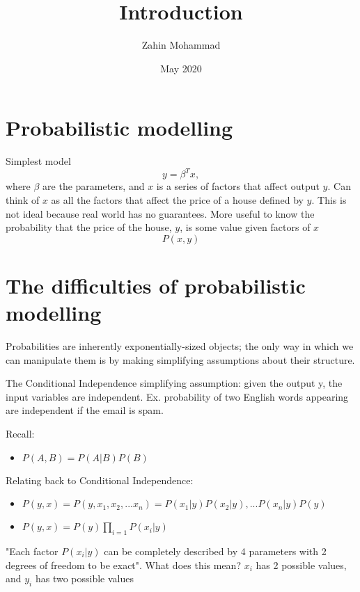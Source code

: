 \documentclass{article}
\title{Introduction}
\author{Zahin Mohammad}
\date{May 2020}
\begin{document}
\maketitle

\section{Probabilistic modelling}

    Simplest model 
    \begin{equation}
        y = \beta^Tx,
    \end{equation}
    where $\beta$ are the parameters, and $x$ is a series of factors that affect output $y$. Can think of $x$ as all the factors that affect the price of a house defined by $y$. This is not ideal because real world has no guarantees.
    \setlength{\parskip}{6pt}
    More useful to know the probability that the price of the house, $y$, is some value given factors of $x$
    \begin{equation}
        P(x,y)
    \end{equation}
\section{The difficulties of probabilistic modelling}
    Probabilities are inherently exponentially-sized objects; the only way in which we can manipulate them is by making simplifying assumptions about their structure.
    \setlength{\parskip}{6pt}

    The Conditional Independence simplifying assumption: given the output y, the input variables are independent. Ex. probability of two English words appearing are independent if the email is spam.
    
    Recall:
    \begin{itemize}
        \item $P(A,B) = P(A|B)P(B)$
    \end{itemize}

    Relating back to Conditional Independence:
    \begin{itemize}
        \item $P(y,x) = P(y,x_1,x_2,...x_n) = P(x_1|y)P(x_2|y),...P(x_n|y)P(y)$ 
        \item $P(y,x) = P(y) \prod_{i=1}{P(x_i|y)}$
    \end{itemize}

    "Each factor $P(x_i|y)$ can be completely described by 4 parameters with 2 degrees of freedom to be exact". What does this mean? $x_i$ has 2 possible values, and $y_i$ has two possible values
\end{document}
